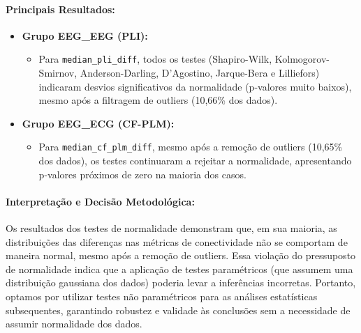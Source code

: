 \paragraph{Principais Resultados:}
\begin{itemize}
    \item \textbf{Grupo EEG\_EEG (PLI):}
    \begin{itemize}
        \item Para \texttt{median\_pli\_diff}, todos os testes (Shapiro-Wilk, Kolmogorov-Smirnov, Anderson-Darling, D'Agostino, Jarque-Bera e Lilliefors) indicaram desvios significativos da normalidade (p-valores muito baixos), mesmo após a filtragem de outliers (10,66\% dos dados).
    \end{itemize}
    
    \item \textbf{Grupo EEG\_ECG (CF-PLM):}
    \begin{itemize}
        \item Para \texttt{median\_cf\_plm\_diff}, mesmo após a remoção de outliers (10,65\% dos dados), os testes continuaram a rejeitar a normalidade, apresentando p-valores próximos de zero na maioria dos casos.
    \end{itemize}
\end{itemize}

\paragraph{Interpretação e Decisão Metodológica:}  
Os resultados dos testes de normalidade demonstram que, em sua maioria, as distribuições das diferenças nas métricas de conectividade não se comportam de maneira normal, mesmo após a remoção de outliers. Essa violação do pressuposto de normalidade indica que a aplicação de testes paramétricos (que assumem uma distribuição gaussiana dos dados) poderia levar a inferências incorretas. Portanto, optamos por utilizar testes não paramétricos para as análises estatísticas subsequentes, garantindo robustez e validade às conclusões sem a necessidade de assumir normalidade dos dados.
